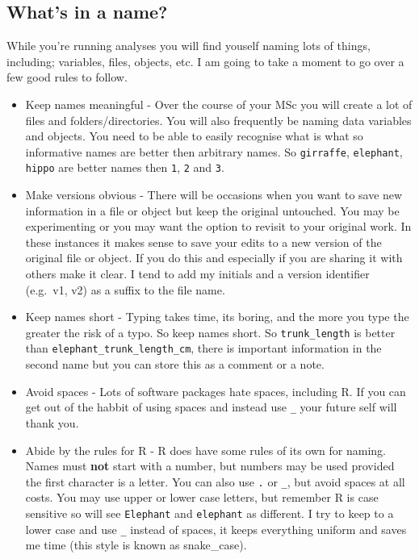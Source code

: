 \documentclass[
]{book}
\begin{document}
\hypertarget{whats-in-a-name}{%
\subsection{What's in a name?}\label{whats-in-a-name}}

While you're running analyses you will find youself naming lots of things, including; variables, files, objects, etc. I am going to take a moment to go over a few good rules to follow.

\begin{itemize}
\item
  Keep names meaningful - Over the course of your MSc you will create a lot of files and folders/directories. You will also frequently be naming data variables and objects. You need to be able to easily recognise what is what so informative names are better then arbitrary names. So \texttt{girraffe}, \texttt{elephant}, \texttt{hippo} are better names then \texttt{1}, \texttt{2} and \texttt{3}.
\item
  Make versions obvious - There will be occasions when you want to save new information in a file or object but keep the original untouched. You may be experimenting or you may want the option to revisit to your original work. In these instances it makes sense to save your edits to a new version of the original file or object. If you do this and especially if you are sharing it with others make it clear. I tend to add my initials and a version identifier (e.g.~v1, v2) as a suffix to the file name.
\item
  Keep names short - Typing takes time, its boring, and the more you type the greater the risk of a typo. So keep names short. So \texttt{trunk\_length} is better than \texttt{elephant\_trunk\_length\_cm}, there is important information in the second name but you can store this as a comment or a note.
\item
  Avoid spaces - Lots of software packages hate spaces, including R. If you can get out of the habbit of using spaces and instead use \texttt{\_} your future self will thank you.
\item
  Abide by the rules for R - R does have some rules of its own for naming. Names must \textbf{not} start with a number, but numbers may be used provided the first character is a letter. You can also use \texttt{.} or \texttt{\_}, but avoid spaces at all costs. You may use upper or lower case letters, but remember R is case sensitive so will see \texttt{Elephant} and \texttt{elephant} as different. I try to keep to a lower case and use \texttt{\_} instead of spaces, it keeps everything uniform and saves me time (this style is known as snake\_case).
\end{itemize}
\end{document}
